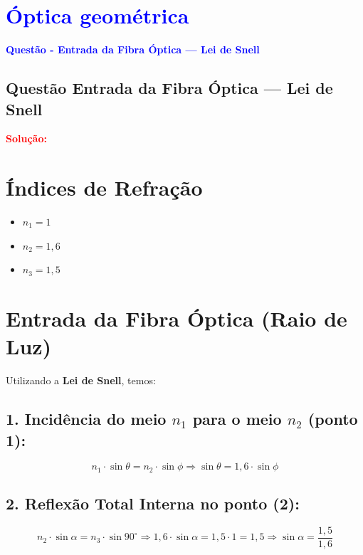\section{\large \textcolor{blue}{Óptica geométrica}}

\begin{flushleft}
\textbf{\textcolor{blue}{\Large Quest\~ao - Entrada da Fibra Óptica — Lei de Snell}}\\
\noindent

\subsection{Quest\~ao Entrada da Fibra Óptica — Lei de Snell}

\vspace{0.5cm}

\textcolor{red}{\textbf{Solução:}}\\

\section*{Índices de Refração}

\begin{itemize}
    \item $n_1 = 1$
    \item $n_2 = 1{,}6$
    \item $n_3 = 1{,}5$
\end{itemize}

\section*{Entrada da Fibra Óptica (Raio de Luz)}

Utilizando a \textbf{Lei de Snell}, temos:

\subsection*{1. Incidência do meio $n_1$ para o meio $n_2$ (ponto 1):}
\[
n_1 \cdot \sin \theta = n_2 \cdot \sin \phi
\Rightarrow \sin \theta = 1{,}6 \cdot \sin \phi
\]

\subsection*{2. Reflexão Total Interna no ponto (2):}
\[
n_2 \cdot \sin \alpha = n_3 \cdot \sin 90^\circ
\Rightarrow 1{,}6 \cdot \sin \alpha = 1{,}5 \cdot 1 = 1{,}5
\Rightarrow \sin \alpha = \frac{1{,}5}{1{,}6}
\]


\end{flushleft}
